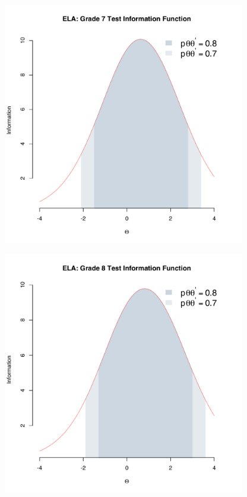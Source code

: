 \documentclass[]{article}
\begin{document}
\begin{figure}
\centering
\includegraphics[height=4.16667in]{tifs/ela7tif.pdf}
\caption{}
\end{figure}

\begin{figure}
\centering
\includegraphics[height=4.16667in]{tifs/ela8tif.pdf}
\caption{}
\end{figure}
\end{document}
